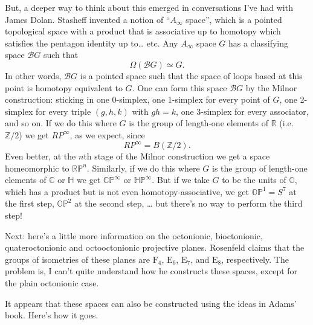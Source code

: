 \documentclass{article}
\begin{document}
But, a deeper way to think about this emerged in conversations I've had
with James Dolan. Stasheff invented a notion of ``\(A_\infty\) space'',
which is a pointed topological space with a product that is associative
up to homotopy which satisfies the pentagon identity up to\ldots{} etc.
Any \(A_\infty\) space \(G\) has a classifying space \(\mathcal{B}G\)
such that \[\Omega(\mathcal{B}G) \simeq G.\] In other words,
\(\mathcal{B}G\) is a pointed space such that the space of loops based
at this point is homotopy equivalent to \(G\). One can form this space
\(\mathcal{B}G\) by the Milnor construction: sticking in one 0-simplex,
one 1-simplex for every point of \(G\), one 2-simplex for every triple
\((g,h,k)\) with \(gh = k\), one 3-simplex for every associator, and so
on. If we do this where \(G\) is the group of length-one elements of
\(\mathbb{R}\) (i.e.~\(\mathbb{Z}/2\)) we get \(RP^\infty\), as we
expect, since \[RP^\infty = B(\mathbb{Z}/2).\] Even better, at the
\(n\)th stage of the Milnor construction we get a space homeomorphic to
\(\mathbb{RP}^n\). Similarly, if we do this where \(G\) is the group of
length-one elements of \(\mathbb{C}\) or \(\mathbb{H}\) we get
\(\mathbb{CP}^\infty\) or \(\mathbb{HP}^\infty\). But if we take \(G\)
to be the units of \(\mathbb{O}\), which has a product but is not even
homotopy-associative, we get \(\mathbb{OP}^1 = S^7\) at the first step,
\(\mathbb{OP}^2\) at the second step, \ldots{} but there's no way to
perform the third step!

Next: here's a little more information on the octonionic, bioctonionic,
quateroctonionic and octooctonionic projective planes. Rosenfeld claims
that the groups of isometries of these planes are \(\mathrm{F}_4\),
\(\mathrm{E}_6\), \(\mathrm{E}_7\), and \(\mathrm{E}_8\), respectively.
The problem is, I can't quite understand how he constructs these spaces,
except for the plain octonionic case.

It appears that these spaces can also be constructed using the ideas in
Adams' book. Here's how it goes.
\end{document}
